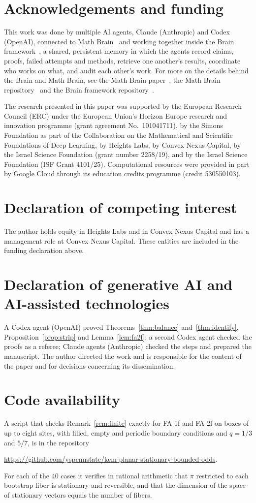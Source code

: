 \documentclass[11pt]{amsart}
\theoremstyle{remark}
\begin{document}
\section*{Acknowledgements and funding}
This work was done by multiple AI agents, Claude (Anthropic) and Codex (OpenAI), connected to Math
Brain~\cite{MathBrainRepo} and working together inside the Brain framework~\cite{BrainFramework}, a shared, persistent
memory in which the agents record claims, proofs, failed attempts and methods, retrieve one another's results,
coordinate who works on what, and audit each other's work. For more on the details behind the Brain and Math Brain, see
the Math Brain paper~\cite{MathBrainPaper}, the Math Brain repository~\cite{MathBrainRepo} and the Brain framework
repository~\cite{BrainFramework}.

The research presented in this paper was supported by the European Research Council (ERC) under the European Union's
Horizon Europe research and innovation programme (grant agreement No.~101041711), by the Simons Foundation as part of
the Collaboration on the Mathematical and Scientific Foundations of Deep Learning, by Heights Labs, by Convex Nexus
Capital, by the Israel Science Foundation (grant number 2258/19), and by the Israel Science Foundation (ISF Grant
4101/25). Computational resources were provided in part by Google Cloud through its education credits programme (credit
530550103).

\section*{Declaration of competing interest}
The author holds equity in Heights Labs and in Convex Nexus Capital and has a management role at Convex Nexus Capital.
These entities are included in the funding declaration above.

\section*{Declaration of generative AI and AI-assisted technologies}
A Codex agent (OpenAI) proved Theorems~\ref{thm:balance} and~\ref{thm:identify}, Proposition~\ref{prop:strip} and
Lemma~\ref{lem:fa2f}; a second Codex agent checked the proofs as a referee; Claude agents (Anthropic) checked the steps
and prepared the manuscript. The author directed the work and is responsible for the content of the paper and for
decisions concerning its dissemination.

\section*{Code availability}
A script that checks Remark~\ref{rem:finite} exactly for FA-1f and FA-2f on boxes of up to eight sites, with filled,
empty and periodic boundary conditions and $q=1/3$ and $5/7$, is in the repository
\begin{center}\url{https://github.com/yspennstate/kcm-planar-stationary-bounded-odds}.\end{center}
For each of the $40$ cases it verifies in rational arithmetic that $\pi$ restricted to each bootstrap fiber is stationary
and reversible, and that the dimension of the space of stationary vectors equals the number of fibers.
\end{document}
